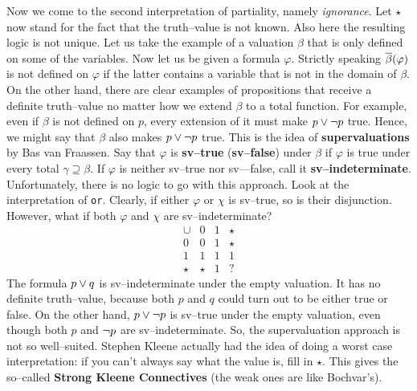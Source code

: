 Now we come to the second interpretation of partiality, namely
{\it ignorance}. Let $\star$ now stand for the fact that the
truth--value is not known. Also here the resulting logic is not
unique. Let us take the example of a valuation $\beta$ that is
only defined on some of the variables. Now let us be given
a formula $\varphi$. Strictly speaking $\overline{\beta}(\varphi)$
is not defined on $\varphi$ if the latter contains a variable
that is not in the domain of $\beta$. On the other hand, there
are clear examples of propositions that receive a definite
truth--value no matter how we extend $\beta$ to a total function.
For example, even if $\beta$ is not defined on $p$, every extension
of it must make $p \vee \neg p$ true. Hence, we might say
that $\beta$ also makes $p \vee \neg p$ true. This is the idea
of \textbf{supervaluations} by Bas van Fraassen. 
Say that
$\varphi$ is \textbf{sv--true} (\textbf{sv--false}) under $\beta$ if
$\varphi$ is true under every total $\gamma \supseteq \beta$.
If $\varphi$ is neither sv--true nor sv---false, call it
\textbf{sv--indeterminate}. Unfortunately, there is no logic
to go with this approach. Look at the interpretation of {\tt or}.
Clearly, if either $\varphi$ or $\chi$ is sv--true, so is
their disjunction. However, what if both $\varphi$ and $\chi$
are sv--indeterminate?
\begin{equation}
\begin{array}{l|lll}
\cup  & 0     & 1 & \star \\\hline
0     & 0     & 1 & \star \\
1     & 1     & 1 & 1     \\
\star & \star & 1 & ?
\end{array}
\end{equation}
The formula $p \vee q$ is sv--indeterminate under the empty valuation.
It has no definite truth--value, because both $p$ and $q$ could turn out
to be either true or false. On the other hand, $p \vee \neg p$ is
sv--true under the empty valuation, even though both $p$ and $\neg p$
are sv--indeterminate. So, the supervaluation approach is not so
well--suited. Stephen Kleene actually had the idea of doing a worst
case interpretation: if you can't always say what the value is, fill
in $\star$. This gives the so--called \textbf{Strong Kleene Connectives}
(the weak ones are like Bochvar's).
\index{$\cap^{\diamond}$, $\cup^{\diamond}$}%
